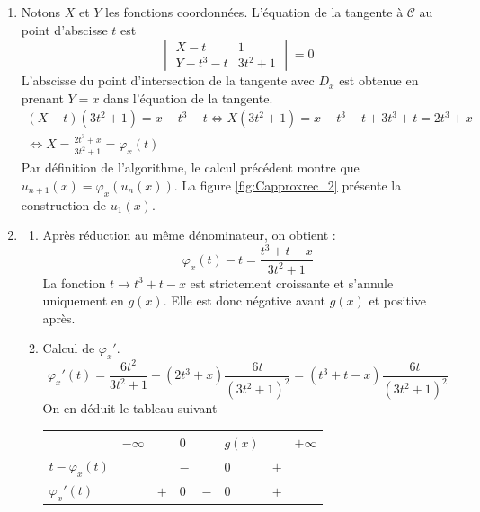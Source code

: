 \begin{enumerate}
 \item Notons $X$ et $Y$ les fonctions coordonnées. L'équation de la tangente à $\mathcal C$ au point d'abscisse $t$ est
\begin{displaymath}
 \begin{vmatrix}
  X-t      &  1\\
  Y -t^3-t & 3t^2+1
 \end{vmatrix}
=0
\end{displaymath}
L'abscisse du point d'intersection de la tangente avec $D_x$ est obtenue en prenant $Y=x$ dans l'équation de la tangente.
\begin{multline*}
 (X-t)(3t^2+1)=x-t^3-t\Leftrightarrow X(3t^2+1)=x-t^3-t+3t^3+t=2t^3+x\\
\Leftrightarrow
X=\frac{2t^3+x}{3t^2+1}=\varphi_x(t)
\end{multline*}
Par définition de l'algorithme, le calcul précédent montre que $u_{n+1}(x)=\varphi_x(u_n(x))$. La figure \ref{fig:Capproxrec_2} présente la construction de $u_1(x)$. 

 \item 
\begin{enumerate}
 \item Après réduction au même dénominateur, on obtient :
\begin{displaymath}
 \varphi_x(t)-t = \frac{t^3+t-x}{3t^2+1}
\end{displaymath}
La fonction $t\rightarrow t^3+t-x$ est strictement croissante et s'annule uniquement en $g(x)$. Elle est donc négative avant $g(x)$ et positive après.
 \item Calcul de $\varphi_x'$.
\begin{displaymath}
 \varphi_x'(t)=\frac{6t^2}{3t^2+1}-(2t^3+x)\frac{6t}{(3t^2+1)^2}
=(t^3+t-x)\frac{6t}{(3t^2+1)^2}
\end{displaymath}
On en déduit le tableau suivant
\begin{center}
\renewcommand{\arraystretch}{1.3}
\begin{tabular}{|l|lllllll|}
\hline
 & $-\infty$ &  & $0$ &  & $g(x)$ &  & $+\infty$\\ \hline
$t-\varphi_x(t)$ &  &  & $-$ &  & $0$ & $+$ & \\ \hline
$\varphi_x'(t)$ &  & $+$ & $0$ & $-$ & $0$ & $+$ & \\ \hline
\end{tabular}
\end{center}
\bigskip


\end{enumerate}
\end{enumerate}
